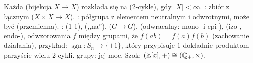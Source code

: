 Każda   (bijekcja $X \to X$) rozkłada się na  (2-cykle), gdy $|X| < \infty$.
: zbiór z łącznym  ($X \times X \to X$).
: półgrupa z elementem neutralnym i odwrotnymi, może być  (przemienna).
:  (1-1),  (,,na''),  ($G \to G$),  (odwracalny: mono- i epi-),  (izo-, endo-), odwzorowania $f$ między grupami, że $f(ab) = f(a)f(b)$ (zachowanie działania), przykład: $\operatorname{sgn} \colon S_n \to \{\pm 1\}$, który przypisuje $1$ dokładnie produktom parzyście wielu 2-cykli.
 grupy: jej moc. 
Szok: $(\mathbb{Z}[x], +) \cong (\mathbb{Q}_+, \times)$.

